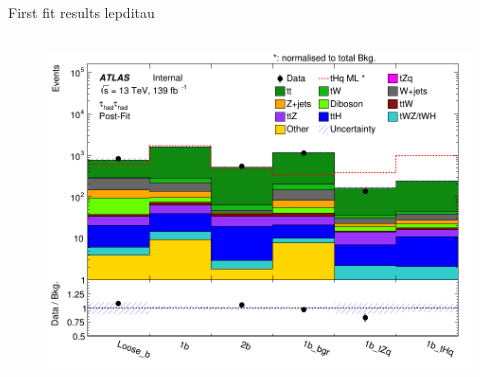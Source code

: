 \begin{frame}{First fit results lepditau}
\begin{columns}
\begin{column}{0.5\textwidth}
\begin{figure}
                \includegraphics[width=\textwidth]{postfit_hadhad}
            \end{figure}
        \end{column}
    \end{columns}
\end{frame}